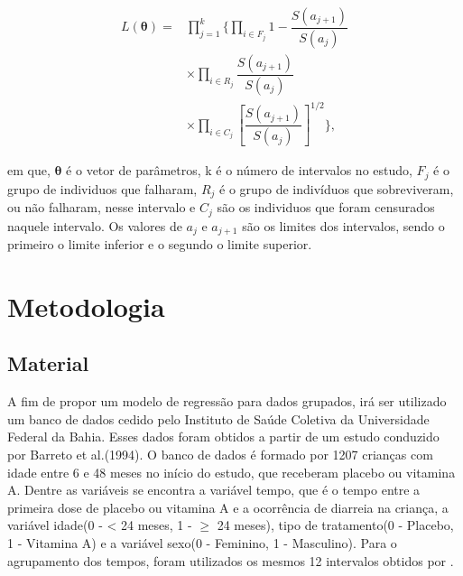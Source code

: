 \documentclass[a4paper,12pt]{article}
\newcommand*\NewPage{\newpage\null\newpage}
\begin{document}
\begin{equation} \label{eq:like_group}
  \begin{split}
    L(\boldsymbol{\theta})  =  &\prod\limits_{j=1}^k\Bigg\{ \prod\limits_{i\in F_j} 1 - \dfrac{S(a_{j+1})}{S(a_{j})} \\
    & \times \prod\limits_{i\in R_j} \dfrac{S(a_{j+1})}{S(a_{j})} \\
    & \times \prod\limits_{i\in C_j} \left[\dfrac{S(a_{j+1})}{S(a_{j})}\right]^{1/2}\Bigg\},
  \end{split}
\end{equation}

\noindent em que, $\boldsymbol{\theta}$ é o vetor de parâmetros, k é o número de intervalos no estudo, $F_j$ é o grupo de individuos que falharam, $R_j$ é o grupo de indivíduos que sobreviveram, ou não falharam, nesse intervalo e $C_j$ são os individuos que foram censurados naquele intervalo. Os valores de $a_j$ e $a_{j+1}$ são os limites dos intervalos, sendo o primeiro o limite inferior e o segundo o limite superior.



\NewPage
\section{Metodologia}
\noindent

\subsection{Material}

A fim de propor um modelo de regressão para dados grupados, irá ser utilizado um banco de dados cedido pelo Instituto de Saúde Coletiva da Universidade Federal da Bahia. Esses dados foram obtidos a partir de um estudo conduzido por Barreto et al.(1994). O banco de dados é formado por 1207 crianças com idade entre 6 e 48 meses no início do estudo, que receberam placebo ou vitamina A. Dentre as variáveis se encontra a variável tempo, que é o tempo entre a primeira dose de placebo ou vitamina A e a ocorrência de diarreia na criança, a variável idade(0 - < 24 meses, 1 - $\ge$ 24 meses), tipo de tratamento(0 - Placebo, 1 - Vitamina A) e a variável sexo(0 - Feminino, 1 - Masculino). Para o agrupamento dos tempos, foram utilizados os mesmos 12 intervalos obtidos por \cite{elisangela}.
\end{document}
